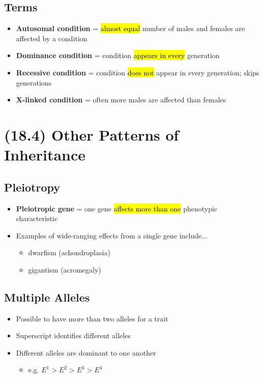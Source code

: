 \documentclass[a4paper,12pt]{article}
\begin{document}
\subsection{Terms}
\begin{itemize}
    \item{\textbf{Autosomal condition} = \hl{almost equal} number of males and females are affected by a condition}
    \item{\textbf{Dominance condition} = condition \hl{appears in every} generation}
    \item{\textbf{Recessive condition} = condition \hl{does not} appear in every generation; skips generations}
    \item{\textbf{X-linked condition} = often more males are affected than females}
\end{itemize}

\section{(18.4) Other Patterns of Inheritance}

\subsection{Pleiotropy}
\begin{itemize}
    \item{\textbf{Pleiotropic gene} = one gene \hl{affects more than one} phenotypic characteristic}
    \item{
            Examples of wide-ranging effects from a single gene include...
            \begin{itemize}
                \item{dwarfism (achondroplasia)}
                \item{gigantism (acromegaly)}
\end{itemize}
        }
\end{itemize}

\subsection{Multiple Alleles}
\begin{itemize}
    \item{Possible to have more than two alleles for a trait}
    \item{Superscript identifies different alleles}
    \item{
            Different alleles are dominant to one another
            \begin{itemize}
                \item{e.g. $E^1 > E^2 > E^3 > E^4$}
            \end{itemize}
        }
\end{itemize}
\end{document}
